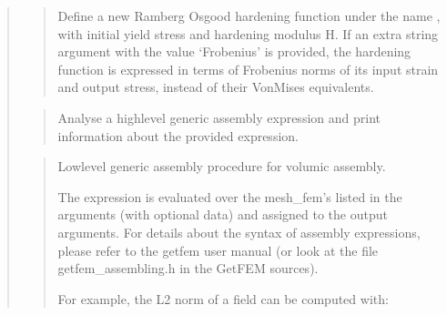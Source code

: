 \documentclass[a4paper,11pt,english]{sphinxmanual}
\begin{document}
\begin{quote}
\begin{quote}
\sphinxAtStartPar
Define a new Ramberg Osgood hardening function under the name ,
with initial yield stress  and hardening modulus H.
If an extra string argument with the value ‘Frobenius’ is provided,
the hardening function is expressed in terms of Frobenius norms of its
input strain and output stress, instead of their Von\sphinxhyphen{}Mises equivalents.
\end{quote}

\sphinxAtStartPar
{}
\begin{quote}

\sphinxAtStartPar
Analyse a high\sphinxhyphen{}level generic assembly expression and print
information about the provided expression.
\end{quote}

\sphinxAtStartPar
{}
\begin{quote}

\sphinxAtStartPar
Low\sphinxhyphen{}level generic assembly procedure for volumic assembly.

\sphinxAtStartPar
The expression  is evaluated over the mesh\_fem’s listed in the
arguments (with optional data) and assigned to the output arguments.
For details about the syntax of assembly expressions, please refer
to the getfem user manual (or look at the file getfem\_assembling.h
in the GetFEM sources).

\sphinxAtStartPar
For example, the L2 norm of a field can be computed with:

\begin{sphinxVerbatim}[commandchars=\\\{\}]
      

\end{sphinxVerbatim}


\end{quote}
\end{quote}
\end{document}
